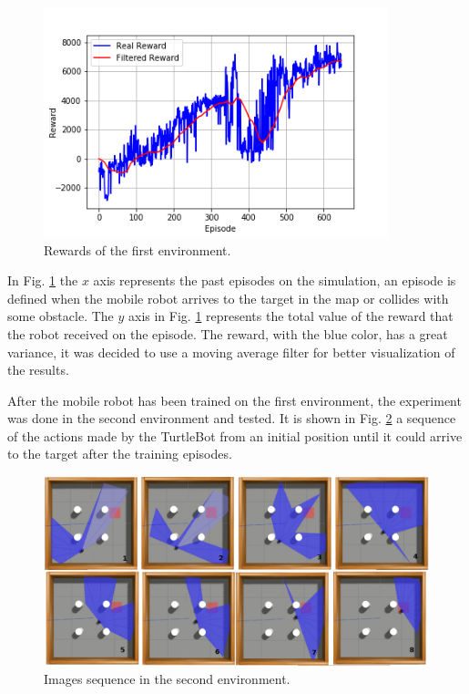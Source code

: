 \begin{figure}[H]
\centerline{\includegraphics[width=10cm]{images/stage_1.png}}
\caption{Rewards of the first environment.}
\label{fig:stage_1}
\end{figure}

In Fig. \ref{fig:stage_1} the $x$ axis represents the past episodes on the simulation, an episode is defined when the mobile robot arrives to the target in the map or collides with some obstacle. 
The $y$ axis in Fig. \ref{fig:stage_1} represents the total value of the reward that the robot received on the episode.
The reward, with the blue color, has a great variance, it was decided to use a moving average filter for better visualization of the results.

After the mobile robot has been trained on the first environment, the experiment was done in the second environment and tested. It is shown in Fig. \ref{fig:amb2target} a sequence of the actions made by the TurtleBot from an initial position until it could arrive to the target after the training episodes.

\begin{figure}[H]
\centerline{\includegraphics[width=\columnwidth]{images/amb2target.png}}
\caption{Images sequence in the second environment.}
\label{fig:amb2target}
\end{figure}

